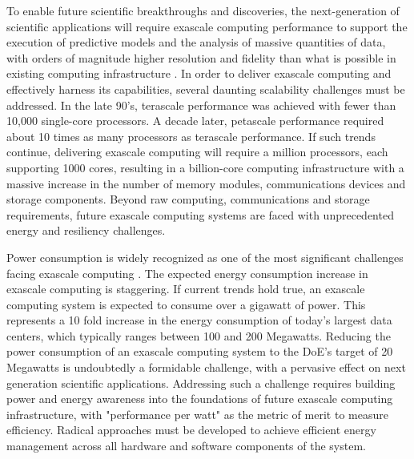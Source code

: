 
To enable future scientific breakthroughs and discoveries, the
next-generation of scientific applications will require exascale
computing performance to support the execution of predictive models
and the analysis of massive quantities of data, with orders of
magnitude higher resolution and fidelity than what is possible in
existing computing infrastructure \cite{sachs_ascr_2011,doe_exascale_2010}. In order to deliver exascale computing and
effectively harness its capabilities, several daunting scalability
challenges must be addressed. In the late 90's, terascale performance
was achieved with fewer than 10,000 single-core processors. A decade
later, petascale performance required about 10 times as many
processors as terascale performance. If such trends continue,
delivering exascale computing will require a million processors, each
supporting 1000 cores, resulting in a billion-core computing
infrastructure with a massive increase in the number of memory
modules, communications devices and storage components. Beyond raw
computing, communications and storage requirements, future exascale
computing systems are faced with unprecedented energy and resiliency
challenges.

Power consumption is widely recognized as one of the most significant
challenges facing exascale computing
\cite{doe_exascale_2010,sachs_ascr_2011}. The expected energy
consumption increase in exascale computing is staggering. If current
trends hold true, an exascale computing system is expected to consume
over a gigawatt of power. This represents a 10 fold increase in the
energy consumption of today's largest data centers, which typically
ranges between 100 and 200 Megawatts. Reducing the power consumption
of an exascale computing system to the DoE's target of 20 Megawatts is
undoubtedly a formidable challenge, with a pervasive effect on next
generation scientific applications. Addressing such a challenge
requires building power and energy awareness into the foundations of
future exascale computing infrastructure, with "performance per watt"
as the metric of merit to measure efficiency. Radical approaches must
be developed to achieve efficient energy management across all
hardware and software components of the system.

